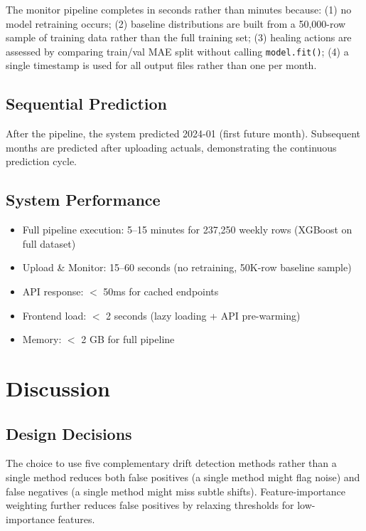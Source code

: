 \documentclass[conference]{IEEEtran}
\begin{document}
The monitor pipeline completes in seconds rather than minutes because: (1) no model retraining occurs; (2) baseline distributions are built from a 50,000-row sample of training data rather than the full training set; (3) healing actions are assessed by comparing train/val MAE split without calling \texttt{model.fit()}; (4) a single timestamp is used for all output files rather than one per month.

\subsection{Sequential Prediction}

After the pipeline, the system predicted 2024-01 (first future month). Subsequent months are predicted after uploading actuals, demonstrating the continuous prediction cycle.

\subsection{System Performance}

\begin{itemize}
    \item Full pipeline execution: 5--15 minutes for 237,250 weekly rows (XGBoost on full dataset)
    \item Upload \& Monitor: 15--60 seconds (no retraining, 50K-row baseline sample)
    \item API response: $<$ 50ms for cached endpoints
    \item Frontend load: $<$ 2 seconds (lazy loading + API pre-warming)
    \item Memory: $<$ 2 GB for full pipeline
\end{itemize}

\section{Discussion}

\subsection{Design Decisions}

The choice to use five complementary drift detection methods rather than a single method reduces both false positives (a single method might flag noise) and false negatives (a single method might miss subtle shifts). Feature-importance weighting further reduces false positives by relaxing thresholds for low-importance features.
\end{document}
